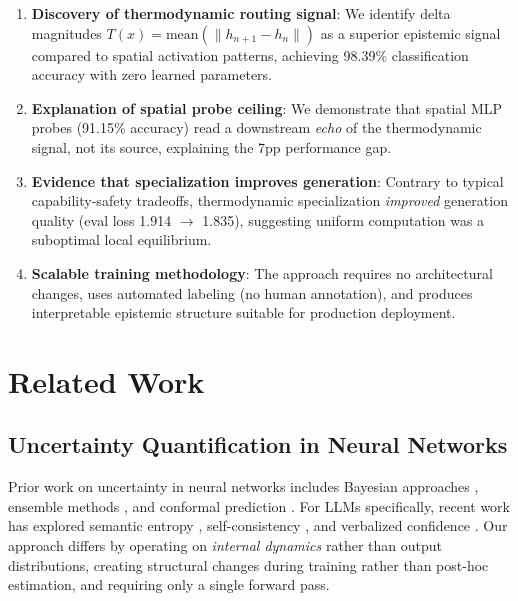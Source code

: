 \documentclass[11pt,a4paper]{article}
\begin{document}
\begin{enumerate}
\item \textbf{Discovery of thermodynamic routing signal}: We identify delta magnitudes $T(x) = \text{mean}(\|h_{n+1} - h_n\|)$ as a superior epistemic signal compared to spatial activation patterns, achieving 98.39\% classification accuracy with zero learned parameters.

\item \textbf{Explanation of spatial probe ceiling}: We demonstrate that spatial MLP probes (91.15\% accuracy) read a downstream \emph{echo} of the thermodynamic signal, not its source, explaining the 7pp performance gap.

\item \textbf{Evidence that specialization improves generation}: Contrary to typical capability-safety tradeoffs, thermodynamic specialization \emph{improved} generation quality (eval loss 1.914 $\rightarrow$ 1.835), suggesting uniform computation was a suboptimal local equilibrium.

\item \textbf{Scalable training methodology}: The approach requires no architectural changes, uses automated labeling (no human annotation), and produces interpretable epistemic structure suitable for production deployment.
\end{enumerate}

\section{Related Work}

\subsection{Uncertainty Quantification in Neural Networks}

Prior work on uncertainty in neural networks includes Bayesian approaches \citep{blundell2015weight, gal2016dropout}, ensemble methods \citep{lakshminarayanan2017simple}, and conformal prediction \citep{angelopoulos2021gentle}. For LLMs specifically, recent work has explored semantic entropy \citep{kuhn2023semantic}, self-consistency \citep{wang2023selfconsistency}, and verbalized confidence \citep{tian2023finetuning}. Our approach differs by operating on \emph{internal dynamics} rather than output distributions, creating structural changes during training rather than post-hoc estimation, and requiring only a single forward pass.
\end{document}

